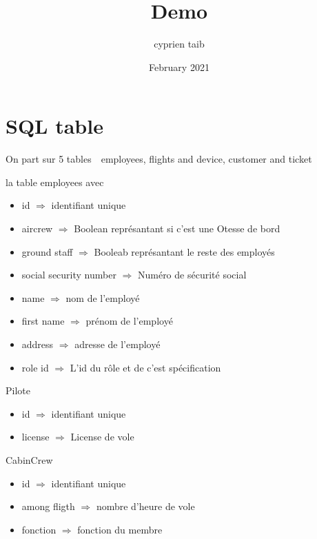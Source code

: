 \documentclass{article}
\title{Demo}
\author{cyprien taib}
\date{February 2021}
\begin{document}
    \maketitle

    \section{SQL table}
        On part sur 5 tables 
           \,\, employees, flights and device, customer and ticket

        la table employees avec 
        
            \begin{itemize}
                \centering
                \item id $\Rightarrow$ identifiant unique 
                \item aircrew $\Rightarrow$ Boolean représantant si c'est une Otesse de bord
                \item ground staff $\Rightarrow$ Booleab représantant le reste des employés
                \item social security number $\Rightarrow$ Numéro de sécurité social
                \item name $\Rightarrow$ nom de l'employé 
                \item first name $\Rightarrow$ prénom de l'employé
                \item address $\Rightarrow$ adresse de l'employé
                \item role id $\Rightarrow$ L'id du rôle et de c'est spécification
            \end{itemize}
        
        Pilote 
            \begin{itemize}
                \centering
                \item id $\Rightarrow$ identifiant unique 
                \item license $\Rightarrow$ License de vole 
            \end{itemize}
        
        CabinCrew 
            \begin{itemize}
                \centering
                \item id $\Rightarrow$ identifiant unique
                \item among fligth $\Rightarrow$ nombre d'heure de vole
                \item fonction $\Rightarrow$ fonction du membre
            \end{itemize}
                
\end{document}
